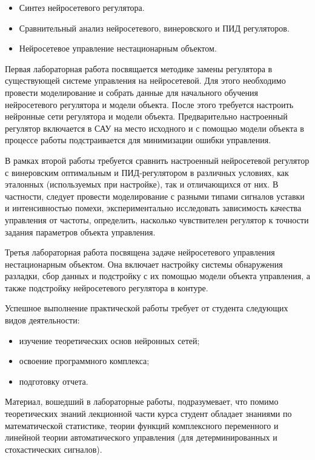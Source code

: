 \begin{itemize}
\item Синтез нейросетевого регулятора.
\item Сравнительный анализ нейросетевого, винеровского и ПИД регуляторов.
\item Нейросетевое управление нестационарным объектом.
\end{itemize}

Первая лабораторная работа посвящается методике замены регулятора в
существующей системе управления на нейросетевой.  Для этого необходимо
провести моделирование и собрать данные для начального обучения
нейросетевого регулятора и модели объекта.  После этого требуется
настроить нейронные сети регулятора и модели объекта.  Предварительно
настроенный регулятор включается в САУ на место исходного и с помощью
модели объекта в процессе работы подстраивается для минимизации ошибки
управления.

В рамках второй работы требуется сравнить настроенный нейросетевой
регулятор с винеровским оптимальным и ПИД-регулятором в различных
условиях, как эталонных (используемых при настройке), так и
отличающихся от них.  В частности, следует провести моделирование с
разными типами сигналов уставки и интенсивностью помехи,
экспериментально исследовать зависимость качества управления от
частоты, определить, насколько чувствителен регулятор к точности
задания параметров объекта управления.

Третья лабораторная работа посвящена задаче нейросетевого управления
нестационарным объектом.  Она включает настройку системы обнаружения
разладки, сбор данных и подстройку с их помощью модели объекта
управления, а также подстройку нейросетевого регулятора в контуре.


Успешное выполнение практической работы требует от студента следующих
видов деятельности:

\begin{itemize}

\item изучение теоретических основ нейронных сетей;

\item освоение программного комплекса;

\item подготовку отчета.

\end{itemize}

Материал, вошедший в лабораторные работы, подразумевает, что помимо
теоретических знаний лекционной части курса студент обладает знаниями
по математической статистике, теории функций комплексного переменного
и линейной теории автоматического управления (для детерминированных и
стохастических сигналов).

